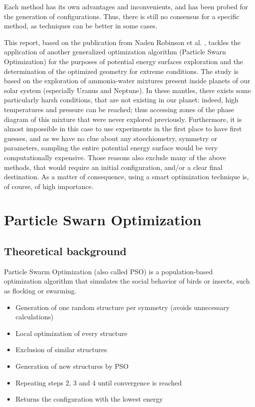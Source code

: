 \documentclass[11pt]{article}
\begin{document}
\begin{multicols}{2}
Each method has its own advantages and inconvenients, and has been probed for the generation of configurations. Thus, there is still no consensus for a specific method, as techniques can be better in some cases. \vspace{1em}

This report, based on the publication from Naden Robinson et al. \cite{original}, tackles the application of another generalized optimization algorithm (Particle Swarn Optimization) for the purposes of potential energy surfaces exploration and the determination of the optimized geometry for extreme conditions. The study is based on the exploration of ammonia-water mixtures present inside planets of our solar system (especially Uranus and Neptune). In these mantles, there exists some particularly harsh conditions, that are not existing in our planet: indeed, high temperatures and pressure can be reached; thus accessing zones of the phase diagram of this mixture that were never explored previously. Furthermore, it is almost impossible in this case to use experiments in the first place to have first guesses, and as we have no clue about any stoechiometry, symmetry or parameters, sampling the entire potential energy surface would be very computationally expensive. Those reasons also exclude many of the above methods, that would require an initial configuration, and/or a clear final destination. As a matter of consequence, using a smart optimization technique is, of course, of high importance.

\section*{Particle Swarn Optimization}
\subsection*{Theoretical background}
Particle Swarm Optimization (also called PSO) is a population-based optimization algorithm that simulates the social behavior of birds or insects, such as flocking or swarming.   \cite{PhysRevB.82.094116,WANG20122063}
\begin{itemize}
\itemsep0em
    \item Generation of one random structure per symmetry (avoids unnecessary calculations)
    \item Local optimization of every structure
    \item Exclusion of similar structures
    \item Generation of new structures by PSO
    \item Repeating steps 2, 3 and 4 until convergence is reached
    \item Returns the configuration with the lowest energy
\end{itemize}
\bigskip


\end{multicols}
\end{document}
